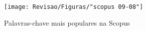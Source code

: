 \begin{figure}[htpb!]
	\centering
	\caption{Palavras-chave mais populares na Scopus}
	\label{fig:scopus-09-08}
	\texttt{[image: Revisao/Figuras/"scopus 09-08"]}
	
\end{figure}